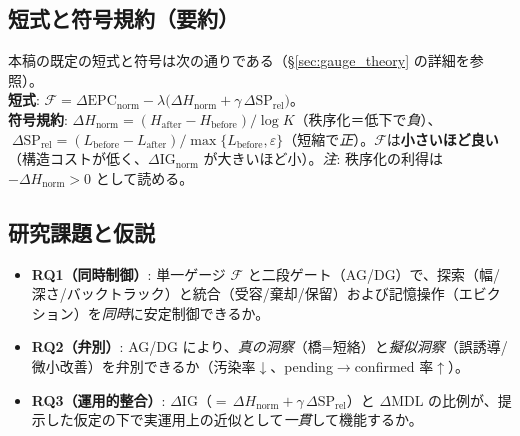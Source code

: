 \documentclass[ja=standard,xelatex]{bxjsarticle}
\newcommand{\F}{\mathcal{F}}
\newcommand{\gednorm}{\Delta\mathrm{EPC}_{\mathrm{norm}}}
\begin{document}
\subsection*{短式と符号規約（要約）}
本稿の既定の短式と符号は次の通りである（§\ref{sec:gauge_theory} の詳細を参照）。\\
\noindent\textbf{短式}: $\F=\gednorm-\lambda\bigl(\Delta H_{\mathrm{norm}}+\gamma\,\Delta\mathrm{SP}_{\mathrm{rel}}\bigr)$。\\
\noindent\textbf{符号規約}: $\Delta H_{\mathrm{norm}}=(H_{\mathrm{after}}-H_{\mathrm{before}})/\log K$（秩序化＝低下で\emph{負}）、$\;\Delta\mathrm{SP}_{\mathrm{rel}}=(L_{\mathrm{before}}-L_{\mathrm{after}})/\max\{L_{\mathrm{before}},\varepsilon\}$（短縮で\emph{正}）。$\F$は\textbf{小さいほど良い}（構造コストが低く、$\Delta\mathrm{IG}_{\mathrm{norm}}$ が大きいほど小）。\;\textit{注}: 秩序化の利得は $-\Delta H_{\mathrm{norm}}>0$ として読める。

\subsection*{研究課題と仮説}
\begin{itemize}[leftmargin=1.4em]
  \item \textbf{RQ1（同時制御）}: 単一ゲージ $\F$ と二段ゲート（AG/DG）で、探索（幅/深さ/バックトラック）と統合（受容/棄却/保留）および記憶操作（エビクション）を\emph{同時}に安定制御できるか。
  \item \textbf{RQ2（弁別）}: AG/DG により、\emph{真の洞察}（橋=短絡）と\emph{擬似洞察}（誤誘導/微小改善）を弁別できるか（汚染率$\downarrow$、pending$\to$confirmed 率$\uparrow$）。
  \item \textbf{RQ3（運用的整合）}: $\Delta\mathrm{IG}$（$=\,\Delta H_{\mathrm{norm}}+\gamma\,\Delta\mathrm{SP}_{\mathrm{rel}}$）と $\Delta\mathrm{MDL}$ の比例が、提示した仮定の下で実運用上の近似として\emph{一貫}して機能するか。
\end{itemize}
\end{document}
